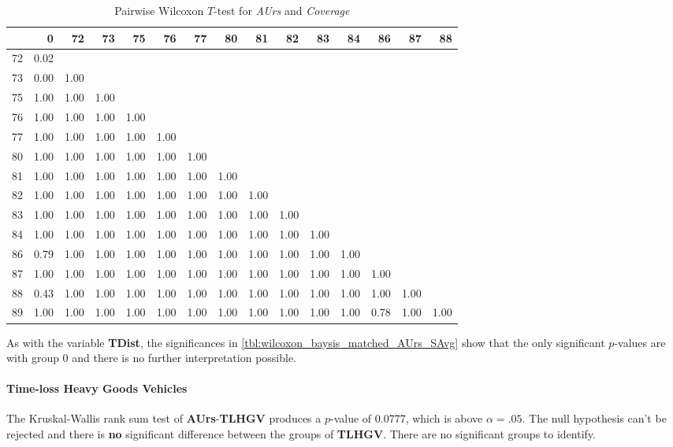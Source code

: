 \begin{table}[ht]
	\tiny
	\centering
    \begin{tabular}{rrrrrrrrrrrrrrr}
        \toprule
        & 0 & 72 & 73 & 75 & 76 & 77 & 80 & 81 & 82 & 83 & 84 & 86 & 87 & 88 \\ 
        \midrule
        72 & 0.02 &  &  &  &  &  &  &  &  &  &  &  &  &  \\ 
        73 & 0.00 & 1.00 &  &  &  &  &  &  &  &  &  &  &  &  \\ 
        75 & 1.00 & 1.00 & 1.00 &  &  &  &  &  &  &  &  &  &  &  \\ 
        76 & 1.00 & 1.00 & 1.00 & 1.00 &  &  &  &  &  &  &  &  &  &  \\ 
        77 & 1.00 & 1.00 & 1.00 & 1.00 & 1.00 &  &  &  &  &  &  &  &  &  \\ 
        80 & 1.00 & 1.00 & 1.00 & 1.00 & 1.00 & 1.00 &  &  &  &  &  &  &  &  \\ 
        81 & 1.00 & 1.00 & 1.00 & 1.00 & 1.00 & 1.00 & 1.00 &  &  &  &  &  &  &  \\ 
        82 & 1.00 & 1.00 & 1.00 & 1.00 & 1.00 & 1.00 & 1.00 & 1.00 &  &  &  &  &  &  \\ 
        83 & 1.00 & 1.00 & 1.00 & 1.00 & 1.00 & 1.00 & 1.00 & 1.00 & 1.00 &  &  &  &  &  \\ 
        84 & 1.00 & 1.00 & 1.00 & 1.00 & 1.00 & 1.00 & 1.00 & 1.00 & 1.00 & 1.00 &  &  &  &  \\ 
        86 & 0.79 & 1.00 & 1.00 & 1.00 & 1.00 & 1.00 & 1.00 & 1.00 & 1.00 & 1.00 & 1.00 &  &  &  \\ 
        87 & 1.00 & 1.00 & 1.00 & 1.00 & 1.00 & 1.00 & 1.00 & 1.00 & 1.00 & 1.00 & 1.00 & 1.00 &  &  \\ 
        88 & 0.43 & 1.00 & 1.00 & 1.00 & 1.00 & 1.00 & 1.00 & 1.00 & 1.00 & 1.00 & 1.00 & 1.00 & 1.00 &  \\ 
        89 & 1.00 & 1.00 & 1.00 & 1.00 & 1.00 & 1.00 & 1.00 & 1.00 & 1.00 & 1.00 & 1.00 & 0.78 & 1.00 & 1.00 \\ 
        \bottomrule
      \end{tabular}
	\caption{Pairwise Wilcoxon $T$-test for \textit{AUrs} and \textit{Coverage}}
	\label{tbl:wilcoxon_baysis_matched_AUrs_Cov}
\end{table}
As with the variable \textbf{TDist}, the significances in \cref{tbl:wilcoxon_baysis_matched_AUrs_SAvg} show that the only significant $p$-values are with group 0 and there is no further interpretation possible.

\paragraph{Time-loss Heavy Goods Vehicles}
The Kruskal-Wallis rank sum test of \textbf{AUrs}-\textbf{TLHGV} produces a $p$-value of 0.0777, which is above $\alpha=.05$. The null hypothesis can't be rejected and there is \textbf{no} significant difference between the groups of \textbf{TLHGV}. There are no significant groups to identify.

